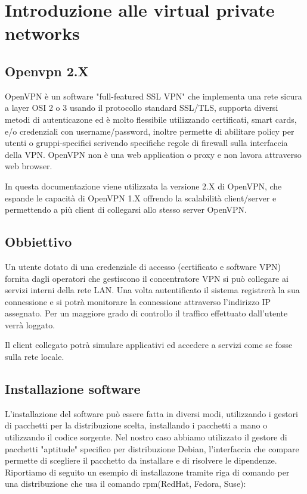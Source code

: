 \chapter{Introduzione alle virtual private networks}  %

\section{Openvpn 2.X}
OpenVPN è un software "full-featured SSL VPN" che implementa una rete sicura a layer OSI 2 o 3 usando il protocollo standard SSL/TLS, supporta diversi metodi di autenticazone ed è molto flessibile utilizzando certificati, smart cards, e/o credenziali con username/password, inoltre permette di abilitare policy per utenti o gruppi-specifici scrivendo specifiche regole di firewall sulla interfaccia della VPN. OpenVPN non è una web application o proxy e non lavora attraverso web browser. 

In questa documentazione viene utilizzata la versione 2.X di OpenVPN, che espande le capacità di OpenVPN 1.X offrendo la scalabilità client/server e permettendo a più client di collegarsi allo stesso server OpenVPN.

\section{Obbiettivo}
Un utente dotato di una credenziale di accesso (certificato e software VPN) fornita dagli operatori che gestiscono il concentratore VPN si può collegare ai servizi interni della rete LAN. Una volta autentificato il sistema registrerà la sua connessione e si potrà monitorare la connessione attraverso l'indirizzo IP assegnato. Per un maggiore grado di controllo il traffico effettuato dall'utente verrà loggato.

Il client collegato potrà simulare applicativi ed accedere a servizi come se fosse sulla rete locale.

\section{Installazione software}
L'installazione del software può essere fatta in diversi modi, utilizzando i gestori di pacchetti per la distribuzione scelta, installando i pacchetti a mano o utilizzando il codice sorgente.
Nel nostro caso abbiamo utilizzato il gestore di pacchetti "aptitude" specifico per distribuzione Debian, l'interfaccia che compare permette di scegliere il pacchetto da installare e di risolvere le dipendenze.
Riportiamo di seguito un esempio di installazone tramite riga di comando per una distribuzione che usa il comando rpm(RedHat, Fedora, Suse):

